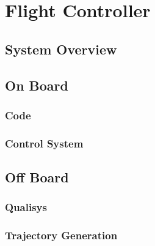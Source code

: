 \section{Flight Controller}

\subsection{System Overview}

\subsection{On Board}
\subsubsection{Code}
\subsubsection{Control System}

\subsection{Off Board}
\subsubsection{Qualisys}
\subsubsection{Trajectory Generation}
